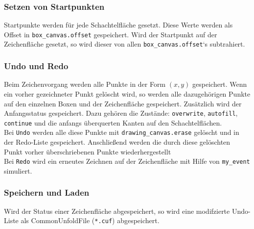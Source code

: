 \subsubsection{Setzen von Startpunkten}
\label{subsubsec:startpunkte}
Startpunkte werden für jede Schachtelfläche gesetzt. Diese Werte werden als Offset in \texttt{box\_canvas.offset} gespeichert. Wird der Startpunkt auf der Zeichenfläche gesetzt, so wird dieser von allen \texttt{box\_canvas.offset}`s subtrahiert.


\subsubsection{Undo und Redo}
\label{subsubsec:undoRedo}

Beim Zeichenvorgang werden alle Punkte in der Form $(x,y)$ gespeichert. Wenn ein vorher gezeichneter Punkt gelöscht wird, so werden alle dazugehörigen Punkte auf den einzelnen Boxen und der Zeichenfläche gespeichert. Zusätzlich wird der Anfangsstatus gespeichert. Dazu gehören die Zustände: \texttt{overwrite}, \texttt{autofill}, \texttt{continue} und die anfangs überquerten Kanten auf den Schachtelflächen.\\

Bei \texttt{Undo} werden alle diese Punkte mit \texttt{drawing\_canvas.erase} gelöscht und in der Redo-Liste gespeichert. Anschließend werden die durch diese gelöschten Punkt vorher überschriebenen Punkte wiederhergestellt\\

Bei \texttt{Redo} wird ein erneutes Zeichnen auf der Zeichenfläche mit Hilfe
von \texttt{my\_event} simuliert.\\


\subsubsection{Speichern und Laden}
\label{subsubsec:speichernLaden}
Wird der Status einer Zeichenfläche abgespeichert, so wird eine modifzierte Undo-Liste als CommonUnfoldFile (\texttt{*.cuf}) abgespeichert.\\

